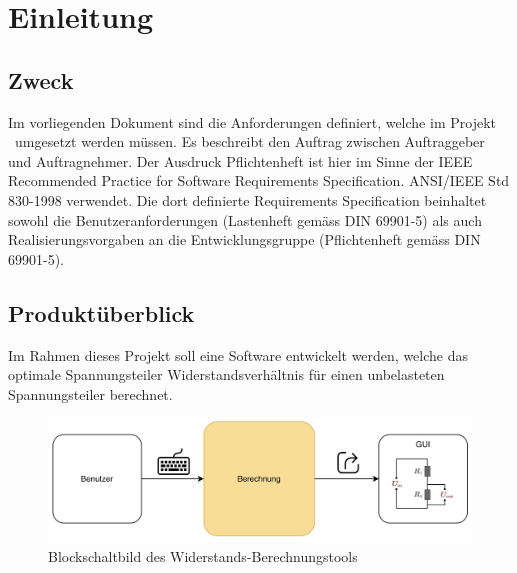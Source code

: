 \section{Einleitung}
\label{sec:intro}

\subsection{Zweck}
Im vorliegenden Dokument sind die Anforderungen definiert, welche im Projekt \subjectinfo\ umgesetzt werden müssen. 
Es beschreibt den Auftrag zwischen Auftraggeber und Auftragnehmer. 
Der Ausdruck Pflichtenheft ist hier im Sinne der IEEE Recommended Practice for Software Requirements Specification. ANSI/IEEE Std 830-1998 verwendet.
Die dort definierte Requirements Specification beinhaltet sowohl die Benutzeranforderungen (Lastenheft gemäss DIN 69901-5) als auch Realisierungsvorgaben an die Entwicklungsgruppe (Pflichtenheft gemäss DIN 69901-5).

\subsection{Produktüberblick}
Im Rahmen dieses Projekt soll eine Software entwickelt werden, welche das optimale Spannungsteiler Widerstandsverhältnis für einen unbelasteten Spannungsteiler berechnet.
\begin{figure}[!h]
	\centering
	\includegraphics[width=12cm]{./images/Block.png}
	\caption{Blockschaltbild des Widerstands-Berechnungstools}
	\label{fig:blockdiagram}
\end{figure}
